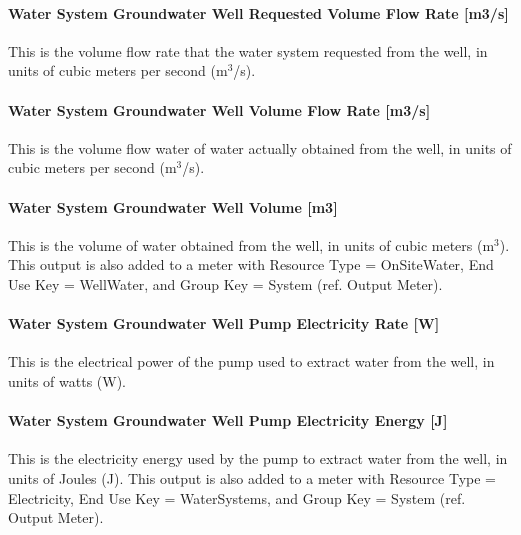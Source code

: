 \paragraph{Water System Groundwater Well Requested Volume Flow Rate {[}m3/s{]}}\label{water-system-groundwater-well-requested-volume-flow-rate-m3s}

This is the volume flow rate that the water system requested from the well, in units of cubic meters per second (m\(^{3}\)/s).

\paragraph{Water System Groundwater Well Volume Flow Rate {[}m3/s{]}}\label{water-system-groundwater-well-volume-flow-rate-m3s}

This is the volume flow water of water actually obtained from the well, in units of cubic meters per second (m\(^{3}\)/s).

\paragraph{Water System Groundwater Well Volume {[}m3{]}}\label{water-system-groundwater-well-volume-m3}

This is the volume of water obtained from the well, in units of cubic meters (m\(^{3}\)). This output is also added to a meter with Resource Type = OnSiteWater, End Use Key = WellWater, and Group Key = System (ref. Output Meter).

\paragraph{Water System Groundwater Well Pump Electricity Rate {[}W{]}}\label{water-system-groundwater-well-pump-electric-power-w}

This is the electrical power of the pump used to extract water from the well, in units of watts (W).

\paragraph{Water System Groundwater Well Pump Electricity Energy {[}J{]}}\label{water-system-groundwater-well-pump-electric-energy-j}

This is the electricity energy used by the pump to extract water from the well, in units of Joules (J). This output is also added to a meter with Resource Type = Electricity, End Use Key = WaterSystems, and Group Key = System (ref. Output Meter).
